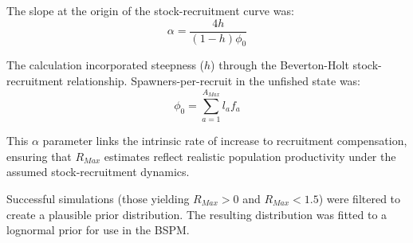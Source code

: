 \documentclass[
  11pt,
]{SCreport}
\begin{document}
The slope at the origin of the stock-recruitment curve was:
\[\alpha = \frac{4h}{(1-h)\phi_0}\]

The calculation incorporated steepness (\(h\)) through the Beverton-Holt
stock-recruitment relationship. Spawners-per-recruit in the unfished
state was: \[\phi_0 = \sum_{a=1}^{A_{Max}} l_a f_a\]

This \(\alpha\) parameter links the intrinsic rate of increase to
recruitment compensation, ensuring that \(R_{Max}\) estimates reflect
realistic population productivity under the assumed stock-recruitment
dynamics.

Successful simulations (those yielding \(R_{Max} > 0\) and
\(R_{Max} < 1.5\)) were filtered to create a plausible prior
distribution. The resulting distribution was fitted to a lognormal prior
for use in the BSPM.
\end{document}
